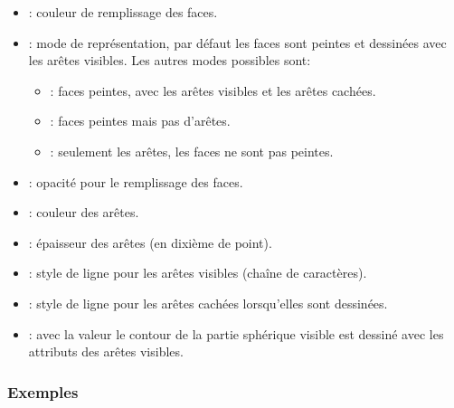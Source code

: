 \begin{itemize}
    \item {} : couleur de remplissage des faces.
    \item {} : mode de représentation, par défaut les faces sont peintes et dessinées avec  les arêtes visibles. Les autres modes possibles sont:
        \begin{itemize}
            \item {} : faces peintes, avec les arêtes visibles et les arêtes cachées.
            \item {} : faces peintes mais pas d'arêtes.
            \item {} : seulement les arêtes, les faces ne sont pas peintes.
        \end{itemize}
    \item {} : opacité pour le remplissage des faces.
    \item {} : couleur des arêtes.
    \item {} : épaisseur des arêtes (en dixième de point).
    \item {} : style de ligne pour les arêtes visibles (chaîne de caractères).
    \item {} : style de ligne pour les arêtes cachées lorsqu'elles sont dessinées.
    \item {} : avec la valeur \true le contour de la partie sphérique visible est dessiné avec les attributs des arêtes visibles.
\end{itemize}

\subsubsection{Exemples}

